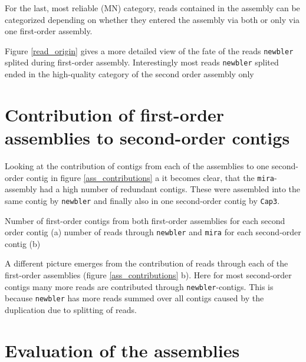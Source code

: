 For the last, most reliable (MN) category, reads contained in the
assembly can be categorized depending on whether they entered the
assembly via both or only via one first-order assembly.


Figure \ref{read_origin} gives a more detailed view of the fate of the
reads \texttt{newbler} splited during first-order
assembly. Interestingly most reads \texttt{newbler} splited ended in
the high-quality category of the second order assembly only 

\section{Contribution of first-order assemblies to second-order contigs}
\label{sec:contr-firs-order}

Looking at the contribution of contigs from each of the assemblies to
one second-order contig in figure \ref{ass_contributions} a it becomes
clear, that the \texttt{mira}-assembly had a high number of redundant
contigs. These were assembled into the same contig by \texttt{newbler}
and finally also in one second-order contig by \texttt{Cap3}.

{Number of first-order contigs from both first-order assemblies for
  each second order contig (a) number of reads through
  \texttt{newbler} and \texttt{mira} for each second-order contig (b)}

A different picture emerges from the contribution of reads through
each of the first-order assemblies (figure \ref{ass_contributions}
b). Here for most second-order contigs many more reads are contributed
through \texttt{newbler}-contigs. This is because \texttt{newbler} has
more reads summed over all contigs caused by the duplication due to
splitting of reads.

\section{Evaluation of the assemblies}
\label{sec:eval-three-assembl}

